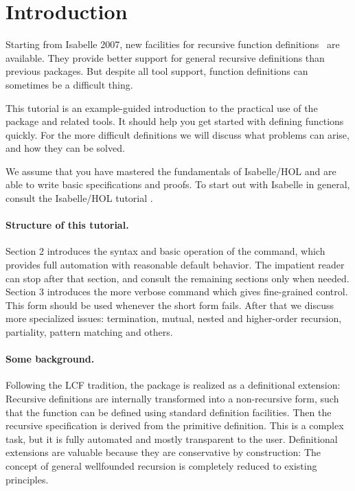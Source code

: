 \section{Introduction}

Starting from Isabelle 2007, new facilities for recursive
function definitions~\cite{krauss2006} are available. They provide
better support for general recursive definitions than previous
packages.  But despite all tool support, function definitions can
sometimes be a difficult thing. 

This tutorial is an example-guided introduction to the practical use
of the package and related tools. It should help you get started with
defining functions quickly. For the more difficult definitions we will
discuss what problems can arise, and how they can be solved.

We assume that you have mastered the fundamentals of Isabelle/HOL
and are able to write basic specifications and proofs. To start out
with Isabelle in general, consult the Isabelle/HOL tutorial
\cite{isa-tutorial}.



\paragraph{Structure of this tutorial.}
Section 2 introduces the syntax and basic operation of the 
command, which provides full automation with reasonable default
behavior.  The impatient reader can stop after that
section, and consult the remaining sections only when needed.
Section 3 introduces the more verbose  command which
gives fine-grained control. This form should be used
whenever the short form fails.
After that we discuss more specialized issues:
termination, mutual, nested and higher-order recursion, partiality, pattern matching
and others.


\paragraph{Some background.}
Following the LCF tradition, the package is realized as a definitional
extension: Recursive definitions are internally transformed into a
non-recursive form, such that the function can be defined using
standard definition facilities. Then the recursive specification is
derived from the primitive definition.  This is a complex task, but it
is fully automated and mostly transparent to the user. Definitional
extensions are valuable because they are conservative by construction:
The  concept of general wellfounded recursion is completely reduced
to existing principles.


